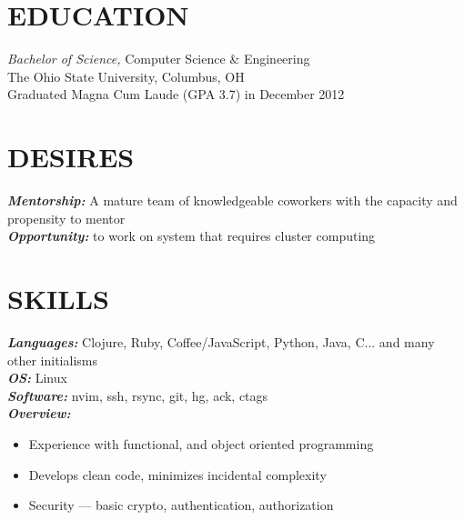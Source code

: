 \documentclass[line,letterpaper]{resume}
\begin{document}
\address{\href{http://www.ryan@ryanmcg.com}{Personal website --- www.ryanmcg.com}}
\address{\href{mailto:ryan@ryanmcg.com}{ryan@ryanmcg.com}}


\begin{resume}
    \vspace{-24pt}
    \section{\uppercase{Education}} {\sl Bachelor of Science,} \/
    Computer Science \& Engineering \\
    The Ohio State University, Columbus, OH \\
    Graduated Magna Cum Laude (GPA 3.7) in December 2012 \\

    \vspace{-20pt}

    \section{\uppercase{Desires}}
    {\sl\textbf{Mentorship:}}\/
    A mature team of knowledgeable coworkers with the capacity and propensity
    to mentor \\
    {\sl\textbf{Opportunity:}}\/
    to work on system that requires cluster computing
    \vspace{-6pt}
    \section{\uppercase{Skills}}
    {\sl\textbf{Languages:}}\/
    Clojure, Ruby, Coffee/JavaScript, Python, Java, C... and many other initialisms \\
    {\sl\textbf{OS:}}\/ Linux \\
    {\sl\textbf{Software:}}\/ nvim, ssh, rsync, git, hg, ack, ctags \\
    {\sl\textbf{Overview:}}
    \begin{itemize}
        \item Experience with functional, and object oriented programming
        \item Develops clean code, minimizes incidental complexity
        \item Security --- basic crypto, authentication, authorization
    \end{itemize}

    \vspace{-6pt}


\end{resume}
\end{document}
